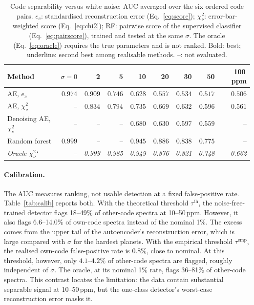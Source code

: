 \begin{table}[t]
  \centering
  \caption{Code separability versus white noise: AUC averaged over the six ordered code pairs. $e_c$: standardised reconstruction error (Eq.~\ref{eq:score}); $\chi^2_\nu$: error-bar-weighted score (Eq.~\ref{eq:chi2}); RF: pairwise score of the supervised classifier (Eq.~\ref{eq:pairscore}), trained and tested at the same $\sigma$. The oracle (Eq.~\ref{eq:oracle}) requires the true parameters and is not ranked. Bold: best; underline: second best among realisable methods. --: not evaluated.}
  \label{tab:noise}
  \begin{tabular}{lrrrrrrrr}
    \toprule
    Method & $\sigma=0$ & 2 & 5 & 10 & 20 & 30 & 50 & 100\,ppm \\
    \midrule
    AE, $e_c$                    & \underline{$0.974$} & $\mathbf{0.909}$     & \underline{$0.746$} & $0.628$             & $0.557$             & $0.534$             & $0.517$             & \underline{$0.506$} \\
    AE, $\chi^2_\nu$             & --                  & \underline{$0.834$}  & $\mathbf{0.794}$    & \underline{$0.735$} & \underline{$0.669$} & \underline{$0.632$} & \underline{$0.596$} & $\mathbf{0.561}$ \\
    Denoising AE, $\chi^2_\nu$   & --                  & --                   & --                  & $0.680$             & $0.630$             & $0.597$             & $0.559$             & -- \\
    Random forest                & $\mathbf{0.999}$    & --                   & --                  & $\mathbf{0.945}$    & $\mathbf{0.886}$    & $\mathbf{0.838}$    & $\mathbf{0.775}$    & -- \\
    \midrule
    \textit{Oracle} $\chi^{2\star}_\nu$ & --           & \textit{0.999}       & \textit{0.985}      & \textit{0.949}      & \textit{0.876}      & \textit{0.821}      & \textit{0.748}      & \textit{0.662} \\
    \bottomrule
  \end{tabular}
\end{table}

\paragraph{Calibration.}
The AUC measures ranking, not usable detection at a fixed false-positive rate.
Table~\ref{tab:calib} reports both.
With the theoretical threshold $\tau^{\mathrm{th}}$, the noise-free-trained detector flags 18--49\% of other-code spectra at 10--50\,ppm.
However, it also flags 6.6--14.0\% of own-code spectra instead of the nominal 1\%.
The excess comes from the upper tail of the autoencoder's reconstruction error, which is large compared with $\sigma$ for the hardest planets.
With the empirical threshold $\tau^{\mathrm{emp}}$, the realised own-code false-positive rate is 0.8\%, close to nominal.
At this threshold, however, only $4.1$--$4.2\%$ of other-code spectra are flagged, roughly independent of $\sigma$.
The oracle, at its nominal 1\% rate, flags 36--81\% of other-code spectra.
This contrast locates the limitation: the data contain substantial separable signal at 10--50\,ppm, but the one-class detector's worst-case reconstruction error masks it.

